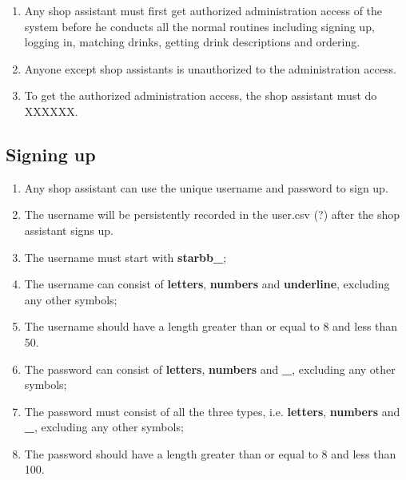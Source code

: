 \documentclass[a4paper]{report}
\begin{document}
\begin{enumerate}
\item Any shop assistant must first get authorized administration access of the system before he conducts all the normal routines including signing up, logging in, matching drinks, getting drink descriptions and ordering. 
\item Anyone except shop assistants is unauthorized to the administration access.
\item To get the authorized administration access, the shop assistant must do XXXXXX.
\end{enumerate}

\subsection{Signing up}

\begin{enumerate}
\item Any shop assistant can use the unique username and password to sign up.
\item The username will be persistently recorded in the user.csv (?) after the shop assistant signs up.
\item The username must start with \textbf{starbb\_};
\item The username can consist of \textbf{letters}, \textbf{numbers} and \textbf{underline}, excluding any other symbols;
\item The username should have a length greater than or equal to 8 and less than 50.
\item The password can consist of \textbf{letters}, \textbf{numbers} and \textbf{\_}, excluding any other symbols;
\item The password must consist of all the three types, i.e. \textbf{letters}, \textbf{numbers} and \textbf{\_}, excluding any other symbols;
\item The password should have a length greater than or equal to 8 and less than 100.
\end{enumerate}
\end{document}
